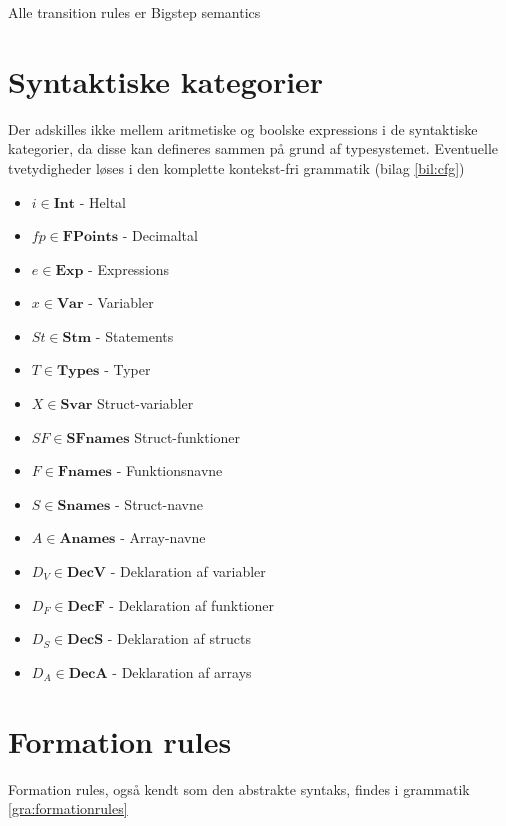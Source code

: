 \renewcommand{\syntleft}{\normalfont\itshape}
\renewcommand{\syntright}{$$}

Alle transition rules er Bigstep semantics

\tocless \section{Syntaktiske kategorier}

Der adskilles ikke mellem aritmetiske og boolske expressions i de syntaktiske kategorier, da disse kan defineres sammen på grund af typesystemet. Eventuelle tvetydigheder løses i den komplette kontekst-fri grammatik (bilag \ref{bil:cfg})

\begin{itemize}
    \item $ i \in \textbf{Int} $ - Heltal
    \item $ fp \in \textbf{FPoints} $ - Decimaltal
    \item $ e \in \textbf{Exp} $ - Expressions
    \item $ x \in \textbf{Var} $ - Variabler
    \item $ St \in \textbf{Stm} $ - Statements
    \item $ T \in \textbf{Types} $ - Typer
    \item $ X \in \textbf{Svar} $ Struct-variabler
    \item $ SF \in \textbf{SFnames} $ Struct-funktioner
    \item $ F \in \textbf{Fnames} $ - Funktionsnavne
    \item $ S \in \textbf{Snames} $ - Struct-navne
    \item $ A \in \textbf{Anames} $ - Array-navne
    \item $ D_V \in \textbf{DecV} $ - Deklaration af variabler
    \item $ D_F \in \textbf{DecF} $ - Deklaration af funktioner
    \item $ D_S \in \textbf{DecS} $ - Deklaration af structs
    \item $ D_A \in \textbf{DecA} $ - Deklaration af arrays
\end{itemize}
\pagebreak

\tocless \section{Formation rules}
\noindent Formation rules, også kendt som den abstrakte syntaks, findes i grammatik \ref{gra:formationrules}

